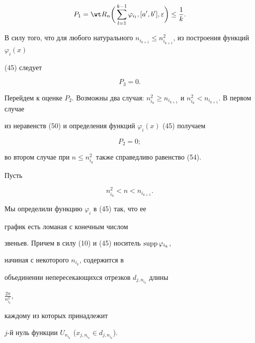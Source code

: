 \begin{pf}
\begin{equation}
P_1=\wt R_n\bigg(\sum^{k-1}_{l=1}\varphi_{i_l},[a',b'], 


\varepsilon\bigg)\le\frac{1}{k}. 


\end{equation} 


 


В силу того, что для любого натурального $n_{i_{k+1}}\le 


n^2_{i_{k+1}}$, из построения функций $\varphi_i(x)$ 


(45) следует 


\begin{equation} 


P_3=0. 


\end{equation} 


Перейдем к оценке $P_2$. Возможны два случая: $n^2_{i_k}\ge 


n_{i_{k+1}}$ и $n^2_{i_k}<n_{i_{k+1}}$. В первом случае 


из неравенств (50) и определения функций $\varphi_i(x)$ (45) получаем 


\begin{equation} 


P_2=0; 


\end{equation} 


во втором случае при $n\le n^2_{i_k}$ также справедливо равенство (54). 


Пусть 


\begin{equation} 


n^2_{i_k}<n<n_{i_{k+1}}. 


\end{equation} 


 


Мы определили функцию $\varphi_i$ в (45) так, что ее 


график есть ломаная с конечным числом 


звеньев. Причем в силу (10) и (45) носитель $\operatorname{supp}\varphi_{i_k}$,


начиная с некоторого $n_{i_k}$, содержится в 


объединении непересекающихся отрезков $d_{j,n_{i_k}}$ длины 


$\frac{2\pi}{n^2_{i_k}}$, 


каждому из которых принадлежит 


$j$-й нуль функции $U_{n_{i_k}}$ ($x_{j,n_{i_k}}\in d_{j,n_{i_k}}$). 



\end{pf}
